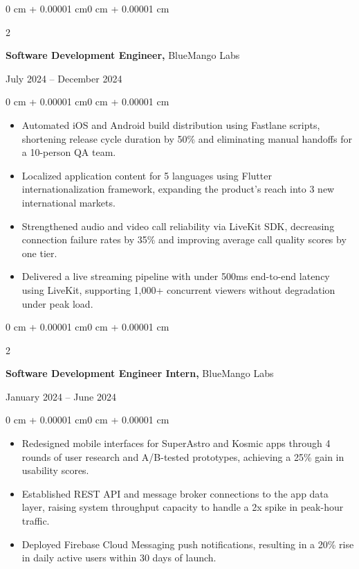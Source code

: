 \documentclass[10pt, letterpaper]{article}
\newenvironment{highlights}{
    \begin{itemize}[
        topsep=0.06 cm,
        parsep=0.06 cm,
        partopsep=0pt,
        itemsep=0pt,
        leftmargin=0 cm + 10pt
    ]
}{
    \end{itemize}
}
\newenvironment{onecolentry}{
    \begin{adjustwidth}{0 cm + 0.00001 cm}{0 cm + 0.00001 cm}
}{
    \end{adjustwidth}
}
\newenvironment{twocolentry}[2][]{
    \onecolentry
    \def\secondColumn{#2}
    \setcolumnwidth{\fill, 4.5 cm}
    \begin{paracol}{2}
}{
    \switchcolumn \raggedleft \secondColumn
    \end{paracol}
    \endonecolentry
}
\begin{document}
\vspace{0.1 cm}

\begin{twocolentry}{July 2024 -- December 2024}
    \textbf{Software Development Engineer,} BlueMango Labs
\end{twocolentry}
\vspace{0.07 cm}
\begin{onecolentry}
    \begin{highlights}
        \item Automated iOS and Android build distribution using Fastlane scripts, shortening release cycle duration by 50\% and eliminating manual handoffs for a 10-person QA team.
        \item Localized application content for 5 languages using Flutter internationalization framework, expanding the product's reach into 3 new international markets.
        \item Strengthened audio and video call reliability via LiveKit SDK, decreasing connection failure rates by 35\% and improving average call quality scores by one tier.
        \item Delivered a live streaming pipeline with under 500ms end-to-end latency using LiveKit, supporting 1,000+ concurrent viewers without degradation under peak load.
    \end{highlights}
\end{onecolentry}

\vspace{0.1 cm}

\begin{twocolentry}{January 2024 -- June 2024}
    \textbf{Software Development Engineer Intern,} BlueMango Labs
\end{twocolentry}
\vspace{0.07 cm}
\begin{onecolentry}
    \begin{highlights}
        \item Redesigned mobile interfaces for SuperAstro and Kosmic apps through 4 rounds of user research and A/B-tested prototypes, achieving a 25\% gain in usability scores.
        \item Established REST API and message broker connections to the app data layer, raising system throughput capacity to handle a 2x spike in peak-hour traffic.
        \item Deployed Firebase Cloud Messaging push notifications, resulting in a 20\% rise in daily active users within 30 days of launch.
    \end{highlights}
\end{onecolentry}
\end{document}
